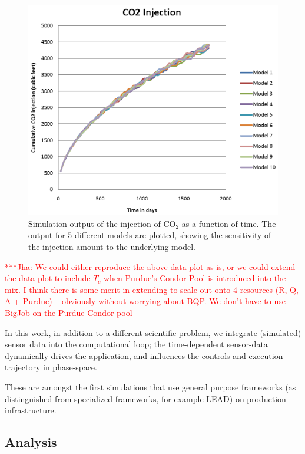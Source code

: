 \documentclass{rspublic}
\newcommand{\jhanote}[1]{ {\textcolor{red} { ***Jha: #1 }}}
\newcommand{\jhanote}[1]{}
\begin{document}
\begin{figure}
\begin{center}
\includegraphics[scale=0.66]{figures/co2seq.png}
\end{center}
\caption[Simulation Output]{Simulation output of the injection of
  CO$_2$ as a function of time. The output for 5 different models are
  plotted, showing the sensitivity of the injection amount to the
  underlying model.}
\label{fig:SensorRelay}
\end{figure}


\jhanote{We could either reproduce the
  above data plot as is, or we could extend the data plot to include
  $T_c$ when Purdue's Condor Pool is introduced into the mix. I think
  there is some merit in extending to scale-out onto 4 resources (R,
  Q, A + Purdue) -- obviously without worrying about BQP. We don't
  have to use BigJob on the Purdue-Condor pool}

In this work, in addition to a different scientific problem, we
integrate (simulated) sensor data into the computational loop; the
time-dependent sensor-data dynamically drives the application, and
influences the controls and execution trajectory in phase-space.

These are amongst the first simulations
that use general purpose frameworks (as distinguished from specialized
frameworks, for example LEAD) on production infrastructure.

\subsection{Analysis} 
\end{document}
